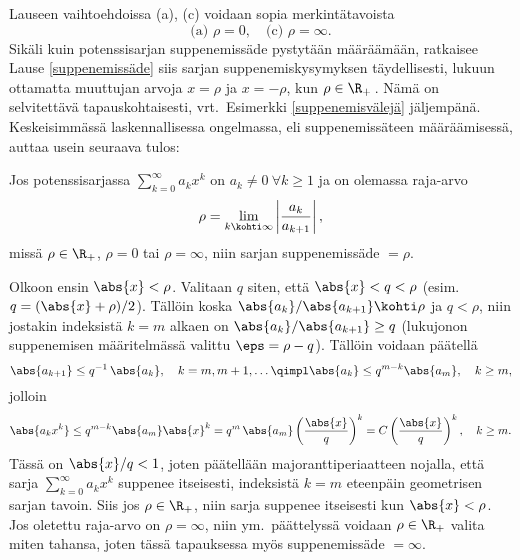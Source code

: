 Lauseen vaihtoehdoissa (a), (c) voidaan sopia merkintätavoista
\[
\text{(a) } \rho=0,\quad \text{(c) } \rho=\infty.
\]
Sikäli kuin potenssisarjan suppenemissäde pystytään määräämään, ratkaisee 
Lause \ref{suppenemissäde} siis sarjan suppenemiskysymyksen täydellisesti, lukuun ottamatta 
muuttujan arvoja  $x = \rho$ ja $x = -\rho$, kun $\rho \in \R_+\,$. Nämä on selvitettävä 
tapauskohtaisesti, vrt.\ Esimerkki \ref{suppenemisvälejä} jäljempänä. Keskeisimmässä 
laskennallisessa ongelmassa, eli suppenemissäteen määräämisessä, auttaa usein seuraava tulos:
\begin{Lause}  \label{suppenemissäteen laskukaava}
Jos potenssisarjassa $\sum_{k=0}^\infty a_k x^k$ on $a_k \neq 0\ \forall k \ge 1$ ja on 
olemassa raja-arvo
\[
\rho=\lim_{k\kohti\infty} \left|\frac{a_k}{a_{k+1}}\right|,
\]
missä $\rho\in\R_+$, $\rho=0$ tai $\rho=\infty$, niin sarjan suppenemissäde $=\rho$.
\end{Lause}
\tod Olkoon ensin $\abs{x} < \rho$. Valitaan $q$ siten, että $\abs{x} < q < \rho$ 
(esim.\ $q = (\abs{x}+\rho)/2$). Tällöin koska $\abs{a_k}/\abs{a_{k+1}} \kohti \rho$ ja 
$q < \rho$, niin jostakin indeksistä $k=m$ alkaen on $\abs{a_k}/\abs{a_{k+1}} \ge q$ 
(lukujonon suppenemisen määritelmässä valittu $\eps = \rho-q$). Tällöin voidaan päätellä
\[
\abs{a_{k+1}} \le q^{-1}\,\abs{a_k},\quad k = m,m+1, \ldots 
               \qimpl \abs{a_k} \le q^{m-k}\abs{a_m}, \quad k \ge m,
\]
jolloin
\[
\abs{a_k x^k} \le q^{m-k}\abs{a_m}\abs{x}^k = q^m\,\abs{a_m}\left(\frac{\abs{x}}{q}\right)^k 
                                            = C\left(\frac{\abs{x}}{q}\right)^k, \quad k \ge m.
\]
Tässä on $\abs{x}/q < 1$, joten päätellään majoranttiperiaatteen nojalla, että sarja 
$\sum_{k=0}^\infty a_k x^k$ suppenee itseisesti, indeksistä $k=m$ eteenpäin geometrisen sarjan
tavoin. Siis jos $\rho \in \R_+$, niin sarja suppenee itseisesti kun $\abs{x} < \rho$. Jos 
oletettu raja-arvo on $\rho = \infty$, niin ym.\ päättelyssä voidaan $\rho \in \R_+$ valita 
miten tahansa, joten tässä tapauksessa myös suppenemissäde $= \infty$.

